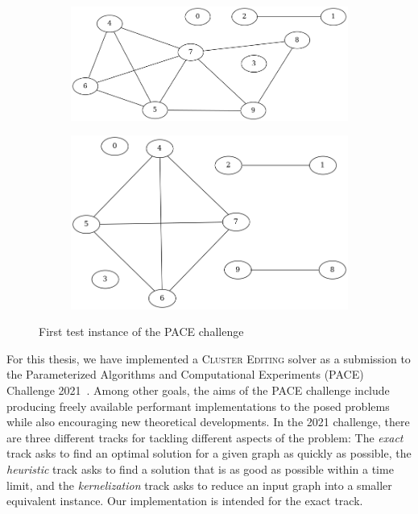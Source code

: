 \documentclass[12pt,oneside,english,parskip=full,headings=small]{scrbook}
\theoremstyle{definition}
\begin{document}
\begin{figure}[h]
	\centering

	\begin{subfigure}{0.49\textwidth}
		\includegraphics[width=1.0\linewidth]{exact001-input}
	\end{subfigure}
	\begin{subfigure}{0.49\textwidth}
		\includegraphics[width=1.0\linewidth]{exact001-output}
	\end{subfigure}

	\caption{First test instance of the PACE challenge}
	\label{fig:exact001}
\end{figure}

For this thesis, we have implemented a \textsc{Cluster Editing} solver as a submission to the
Parameterized Algorithms and Computational Experiments (PACE) Challenge 2021~\cite{Pace}. Among
other goals, the aims of the PACE challenge include producing freely available performant
implementations to the posed problems while also encouraging new theoretical developments. In the
2021 challenge, there are three different tracks for tackling different aspects of the problem: The
\emph{exact} track asks to find an optimal solution for a given graph as quickly as possible, the
\emph{heuristic} track asks to find a solution that is as good as possible within a time limit, and
the \emph{kernelization} track asks to reduce an input graph into a smaller equivalent instance. Our
implementation is intended for the exact track.
\end{document}
